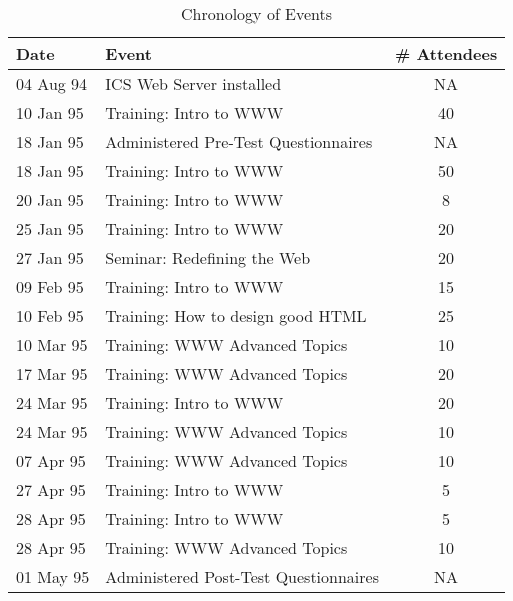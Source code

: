 \begin{table}[htb]
\caption{Chronology of Events}
\begin{center}
\begin{tabular}{|l|l|c|} \hline
{\bf Date}    & {\bf Event}   & {\bf \# Attendees} \\ \hline
04 Aug 94     & ICS Web Server installed  & NA\\
10 Jan 95     & Training: Intro to WWW  & 40\\
18 Jan 95     & Administered Pre-Test Questionnaires & NA\\
18 Jan 95     & Training: Intro to WWW  & 50\\
20 Jan 95     & Training: Intro to WWW  & 8\\
25 Jan 95     & Training: Intro to WWW  & 20\\
27 Jan 95     & Seminar: Redefining the Web  & 20\\
09 Feb 95     & Training: Intro to WWW  & 15\\
10 Feb 95     & Training: How to design good HTML & 25\\
10 Mar 95     & Training: WWW Advanced Topics & 10\\
17 Mar 95     & Training: WWW Advanced Topics & 20\\
24 Mar 95     & Training: Intro to WWW  & 20\\
24 Mar 95     & Training: WWW Advanced Topics  & 10\\
07 Apr 95     & Training: WWW Advanced Topics  & 10\\
27 Apr 95     & Training: Intro to WWW  & 5\\
28 Apr 95     & Training: Intro to WWW  & 5\\
28 Apr 95     & Training: WWW Advanced Topics  & 10\\ 
01 May 95     & Administered Post-Test Questionnaires & NA\\ \hline 
\end{tabular}
\end{center}
\label{tab:chronology}
\end{table}

